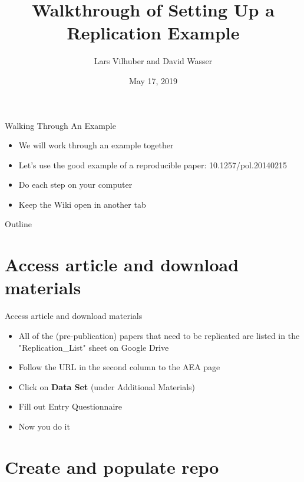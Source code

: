 \documentclass[xcolor={dvipsnames}]{beamer}
\title[LDI Training]{Walkthrough of Setting Up a Replication Example}
\author{Lars Vilhuber and David Wasser}
\date{May 17, 2019}
\theoremstyle{definition}
\begin{document}
\makeatletter
\def\@listi{\leftmargin\leftmarginii \parsep .2em \itemsep 1em}
\def\@listii{\leftmargin\leftmarginii \topsep .2em \parsep .2em \itemsep .2em}
\makeatother

\begin{frame}[plain]
\titlepage
\addtocounter{framenumber}{-1}
\end{frame}

\begin{frame}{Walking Through An Example}
\begin{itemize}
    \item We will work through an example together
    \item Let's use the good example of a reproducible paper: 10.1257/pol.20140215
    \item Do each step on your computer
    \item Keep the Wiki open in another tab
\end{itemize}
\end{frame}

\begin{frame}{Outline}
\tableofcontents
\end{frame}

\section{Access article and download materials}

\begin{frame}{Access article and download materials}
\begin{itemize}
    \item All of the (pre-publication) papers that need to be replicated are listed in the "Replication\_List" sheet on Google Drive 
    \item Follow the URL in the second column to the AEA page
    \item Click on \textbf{Data Set} (under Additional Materials)
    \item Fill out Entry Questionnaire
    \pause
    \item Now you do it
\end{itemize}
\end{frame}

\section{Create and populate repo}
\end{document}
